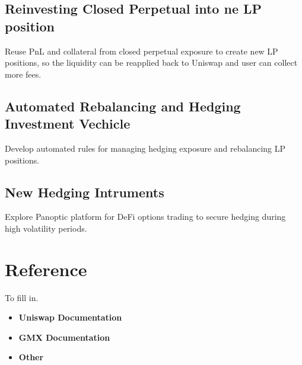 \documentclass[12pt]{article}
\begin{document}
\subsection{Reinvesting Closed Perpetual into ne LP position}
Reuse PnL and collateral from closed perpetual exposure to create new LP positions, so the liquidity can be reapplied back to Uniswap and user can collect more fees.

\subsection{Automated Rebalancing and Hedging Investment Vechicle}
Develop automated rules for managing hedging exposure and rebalancing LP positions.

\subsection{New Hedging Intruments}
Explore Panoptic platform for DeFi options trading to secure hedging during high volatility periods.

\newpage

\section{Reference}
\label{sec:ref}
To fill in.
\begin{itemize}
	\item \textbf{Uniswap Documentation}
	\item \textbf{GMX Documentation}
	\item \textbf{Other}
\end{itemize}
\end{document}
